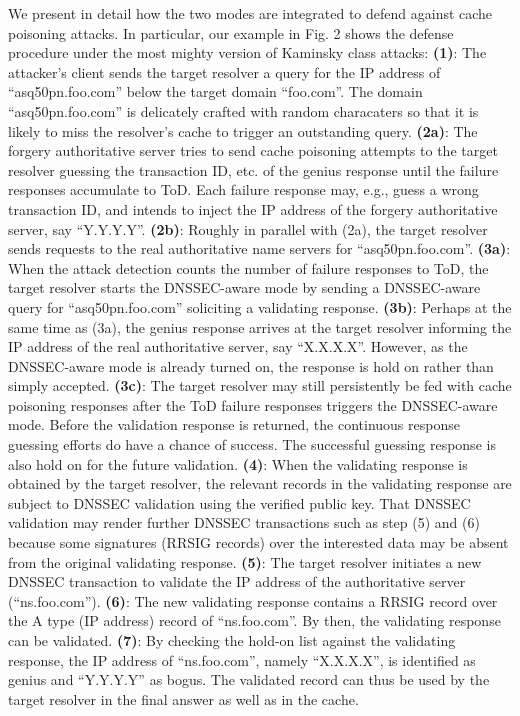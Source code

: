 \documentclass[conference]{IEEEtran}
\begin{document}
We present in detail how the two modes are integrated to defend against cache poisoning attacks. In particular, our example in Fig. 2 shows the defense procedure under the most mighty version of Kaminsky class attacks:
\textbf{(1)}: The attacker's client sends the target resolver a query for the IP address of ``asq50pn.foo.com'' below the target domain ``foo.com''. The domain ``asq50pn.foo.com'' is delicately crafted with random characaters so that it is likely to miss the resolver's cache to trigger an outstanding query.
\textbf{(2a)}: The forgery authoritative server tries to send cache poisoning attempts to the target resolver guessing the transaction ID, etc. of the genius response until the failure responses accumulate to ToD. Each failure response may, e.g., guess a wrong transaction ID, and intends to inject the IP address of the forgery authoritative server, say ``Y.Y.Y.Y''.
\textbf{(2b)}: Roughly in parallel with (2a), the target resolver sends requests to the real authoritative name servers for ``asq50pn.foo.com''.
\textbf{(3a)}: When the attack detection counts the number of failure responses to ToD, the target resolver starts the DNSSEC-aware mode by sending a DNSSEC-aware query for ``asq50pn.foo.com'' soliciting a validating response.
\textbf{(3b)}: Perhaps at the same time as (3a), the genius response arrives at the target resolver informing the IP address of the real authoritative server, say ``X.X.X.X''. However, as the DNSSEC-aware mode is already turned on, the response is hold on rather than simply accepted.
\textbf{(3c)}: The target resolver may still persistently be fed with cache poisoning responses after the ToD failure responses triggers the DNSSEC-aware mode. Before the validation response is returned, the continuous response guessing efforts do have a chance of success. The successful guessing response is also hold on for the future validation.
\textbf{(4)}: When the validating response is obtained by the target resolver, the relevant records in the validating response are subject to DNSSEC validation using the verified public key. That DNSSEC validation may render further DNSSEC transactions such as step (5) and (6) because some signatures (RRSIG records) over the interested data may be absent from the original validating response.
\textbf{(5)}: The target resolver initiates a new DNSSEC transaction to validate the IP address of the authoritative server (``ns.foo.com'').
\textbf{(6)}: The new validating response contains a RRSIG record over the A type (IP address) record of ``ns.foo.com''. By then, the validating response can be validated.
\textbf{(7)}: By checking the hold-on list against the validating response, the IP address of ``ns.foo.com'', namely ``X.X.X.X'', is identified as genius and ``Y.Y.Y.Y'' as bogus. The validated record can thus be used by the target resolver in the final answer as well as in the cache.
\end{document}
